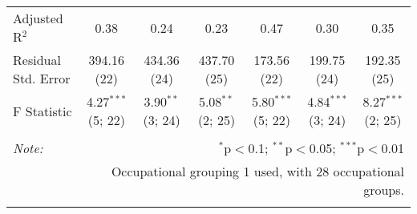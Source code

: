 \begin{sidewaystable}[!htbp]
\begin{tabular}{@{\extracolsep{0pt}}lcccccc}
Adjusted R$^{2}$ & 0.38 & 0.24 & 0.23 & 0.47 & 0.30 & 0.35 \\ 
Residual Std. Error & 394.16 (22) & 434.36 (24) & 437.70 (25) & 173.56 (22) & 199.75 (24) & 192.35 (25) \\ 
F Statistic & 4.27$^{***}$ (5; 22) & 3.90$^{**}$ (3; 24) & 5.08$^{**}$ (2; 25) & 5.80$^{***}$ (5; 22) & 4.84$^{***}$ (3; 24) & 8.27$^{***}$ (2; 25) \\ 
\hline 
\hline \\[-1.8ex] 
\textit{Note:}  & \multicolumn{6}{r}{$^{*}$p$<$0.1; $^{**}$p$<$0.05; $^{***}$p$<$0.01} \\ 
 & \multicolumn{6}{r}{Occupational grouping 1 used, with 28 occupational groups.} \\ 
\normalsize 
\end{tabular} 
\end{sidewaystable} 

